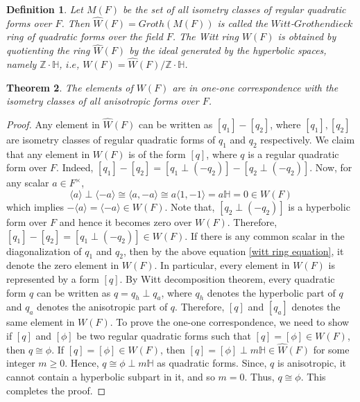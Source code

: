 \documentclass[sn-mathphys-num]{sn-jnl}%
\newtheorem{theorem}{Theorem}[section]
\newtheorem{definition}[theorem]{Definition}
\begin{document}

\begin{definition}
Let $M(F)$ be the set of all isometry classes of regular quadratic forms over $F$. Then $\widehat{W}(F)= Groth(M(F))$ is called the $Witt$-$Grothendieck$ ring of quadratic forms over the field $F$.
The Witt ring $W(F)$ is obtained by quotienting the ring $\widehat{W}(F)$ by the ideal generated by the hyperbolic spaces, namely $\mathbb{Z \cdot H}$, $i.e$,
$W(F)= \widehat{W}(F) / \mathbb{Z \cdot H}$.
\end{definition}
\medskip 
\begin{theorem}
    The elements of $W(F)$ are in one-one correspondence with the isometry classes of all anisotropic forms over $F$.
\end{theorem}
\begin{proof}
    Any element in $\widehat W(F)$ can be written as $[q_1]-[q_2]$, where $[q_1], [q_2]$ are isometry classes of regular quadratic forms of $q_1$ and $q_2$ respectively. We claim that any element in $W(F)$ is of the form $[q]$, where $q$ is a regular quadratic form over $F$. Indeed, $[q_1]-[q_2]= [q_1 \perp (-q_2)]-[q_2 \perp (-q_2)]$. Now, for any scalar $a \in F^\times$, 
    \begin{equation} \label{witt ring equation}
          \langle a \rangle \perp \langle -a \rangle \cong \langle a, -a \rangle \cong a \langle 1,-1 \rangle = a \mathbb H = 0 \in W(F)
    \end{equation}
    which implies $- \langle a \rangle= \langle -a \rangle \in W(F)$. Note that, $[q_2 \perp (-q_2)]$ is a hyperbolic form over $F$ and hence it becomes zero over $W(F)$. Therefore, $[q_1]-[q_2]= [q_1 \perp (-q_2)] \in W(F)$. If there is any common scalar in the diagonalization of $q_1$ and $q_2$, then by the above equation \ref{witt ring equation}, it denote the zero element in $W(F)$. In particular, every element in $W(F)$ is represented by a form $[q]$. By Witt decomposition theorem, every quadratic form $q$ can be written as $q=q_h \perp q_a$, where $q_h$ denotes the hyperbolic part of $q$ and $q_a$ denotes the anisotropic part of $q$. Therefore, $[q]$ and $[q_a]$ denotes the same element in $W(F)$. To prove the one-one correspondence, we need to show if $[q]$ and $[\phi]$ be two regular quadratic forms such that $[q]= [\phi ] \in W(F)$, then $q \cong \phi$. If $[q]= [\phi ] \in W(F)$, then $[q]= [\phi] \perp m \mathbb H \in \widehat W(F)$ for some integer $m \geq 0$. Hence, $q \cong \phi \perp m \mathbb H$ as quadratic forms. Since, $q$ is anisotropic, it cannot contain a hyperbolic subpart in it, and so $m=0$. Thus, $q \cong \phi$. This completes the proof.
\end{proof}
\end{document}
